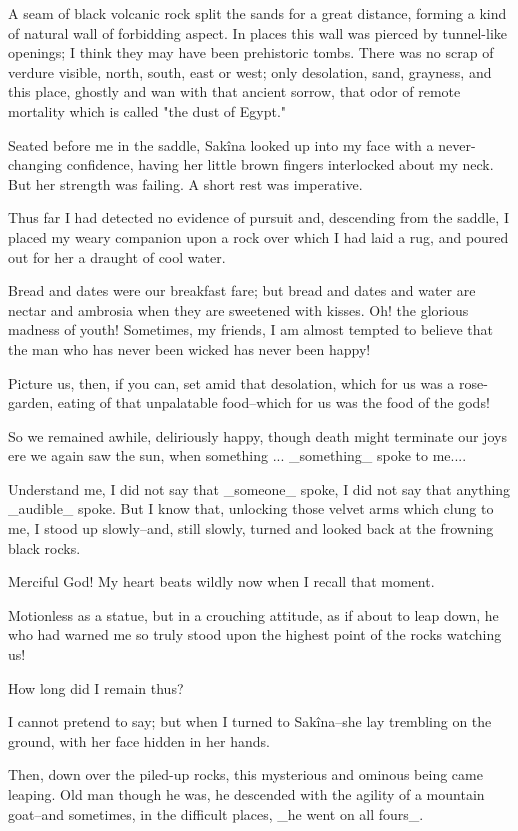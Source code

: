 A seam of black volcanic rock split the sands for a great distance,
forming a kind of natural wall of forbidding aspect. In places this
wall was pierced by tunnel-like openings; I think they may have been
prehistoric tombs. There was no scrap of verdure visible, north,
south, east or west; only desolation, sand, grayness, and this place,
ghostly and wan with that ancient sorrow, that odor of remote
mortality which is called "the dust of Egypt."

Seated before me in the saddle, Sakîna looked up into my face with a
never-changing confidence, having her little brown fingers interlocked
about my neck. But her strength was failing. A short rest was
imperative.

Thus far I had detected no evidence of pursuit and, descending from
the saddle, I placed my weary companion upon a rock over which I had
laid a rug, and poured out for her a draught of cool water.

Bread and dates were our breakfast fare; but bread and dates and water
are nectar and ambrosia when they are sweetened with kisses. Oh! the
glorious madness of youth! Sometimes, my friends, I am almost tempted
to believe that the man who has never been wicked has never been
happy!

Picture us, then, if you can, set amid that desolation, which for us
was a rose-garden, eating of that unpalatable food--which for us was
the food of the gods!

So we remained awhile, deliriously happy, though death might terminate
our joys ere we again saw the sun, when something ... _something_
spoke to me....

Understand me, I did not say that _someone_ spoke, I did not say that
anything _audible_ spoke. But I know that, unlocking those velvet arms
which clung to me, I stood up slowly--and, still slowly, turned and
looked back at the frowning black rocks.

Merciful God! My heart beats wildly now when I recall that moment.

Motionless as a statue, but in a crouching attitude, as if about to
leap down, he who had warned me so truly stood upon the highest point
of the rocks watching us!

How long did I remain thus?

I cannot pretend to say; but when I turned to Sakîna--she lay
trembling on the ground, with her face hidden in her hands.

Then, down over the piled-up rocks, this mysterious and ominous being
came leaping. Old man though he was, he descended with the agility of
a mountain goat--and sometimes, in the difficult places, _he went on
all fours_.

